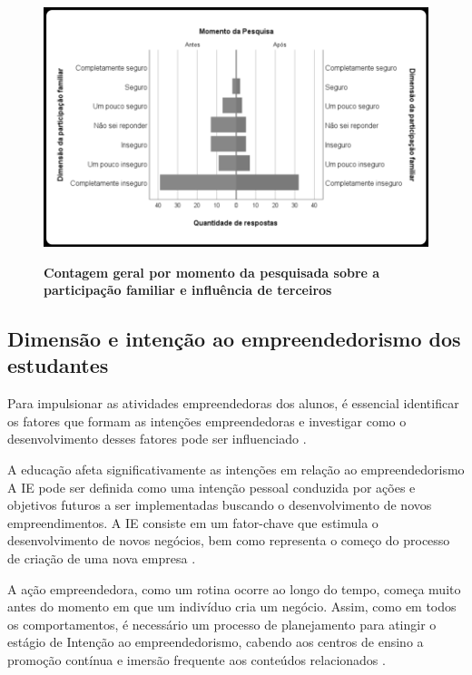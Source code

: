 \begin{figure}[H]
\centering
\caption{\textbf{Contagem geral por momento da pesquisada sobre a participação familiar e influência de terceiros}}
\includegraphics[scale=0.4]{Imagens/dimensao_familiar.png}
\label{figura_60}
\end{figure}


\subsection{Dimensão e intenção ao empreendedorismo dos estudantes}

Para impulsionar as atividades empreendedoras dos alunos, é essencial identificar os fatores que formam as intenções empreendedoras e investigar como o desenvolvimento desses fatores pode ser influenciado \cite{gubik_entrepreneurial_2019}. 

A educação afeta significativamente as intenções em relação ao empreendedorismo
A IE pode ser definida como uma intenção pessoal conduzida por ações e objetivos futuros a ser implementadas buscando o desenvolvimento de novos empreendimentos. 
A IE consiste em um fator-chave que estimula o desenvolvimento de novos negócios, bem como representa o começo do processo de criação de uma nova empresa \cite{vasconcellos-guedes_e-surveys:_2007}.

A ação empreendedora, como um rotina ocorre ao longo do tempo, começa muito antes do momento em que um indivíduo cria um negócio. Assim, como em todos os comportamentos, é necessário um processo de planejamento para atingir o estágio de Intenção ao empreendedorismo, cabendo aos centros de ensino a promoção contínua e imersão frequente aos conteúdos relacionados \cite{garcia-rodriguez_entrepreneurial_2017}. 

